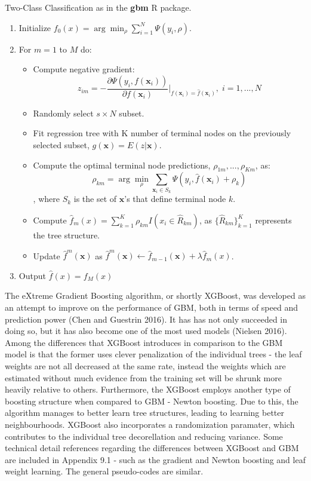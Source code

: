 \documentclass[12pt,]{article}
\providecommand{\tightlist}{%
  \setlength{\itemsep}{0pt}\setlength{\parskip}{0pt}}
\begin{document}
Two-Class Classification as in the \textbf{gbm} R package.

\begin{enumerate}
\def\labelenumi{\arabic{enumi}.}
\item
  Initialize \(f_{0}(x) = \arg\min_{\rho}\sum_{i=1}^{N}\Psi(y_i,\rho)\).
\item
  For \(m=1\) to \(M\) do:

  \begin{itemize}
  \tightlist
  \item
    Compute negative gradient:
    \[z_{im}=-\frac{\partial{\Psi(y_{i},f(\mathbf{x}_i))}}{\partial{f(\mathbf{x}_i)}}\rvert_{f(\mathbf{x}_i)=\widehat{f}(\mathbf{x}_i)},\; i=1,...,N\]
  \item
    Randomly select \(s \times N\) subset.
  \item
    Fit regression tree with K number of terminal nodes on the
    previously selected subset, \(g(\mathbf{x})=E(z|\mathbf{x})\).
  \item
    Compute the optimal terminal node predictions,
    \(\rho_{1m},...,\rho_{Km}\), as:
    \[\rho_{km}=\arg\min_{\rho}\sum_{\mathbf{x}_i \in S_k} \Psi(y_i,\widehat{f}(\mathbf{x}_{i})+\rho_k)\],
    where \(S_k\) is the set of \(\mathbf{x}\)'s that define terminal
    node \(k\).
  \item
    Compute
    \(\widehat{f}_{m}(x)=\sum_{k=1}^{K}\rho_{km}I(x_i\in\widehat{R}_{km})\),
    as \(\{\widehat{R}_{km}\}_{k=1}^{K}\) represents the tree structure.
  \item
    Update \(\widehat{f}^{m}(\mathbf{x})\) as
    \(\widehat{f}^{m}(\mathbf{x}) \leftarrow \widehat{f}_{m-1}(\mathbf{x}) + \lambda\widehat{f}_{m}(x)\).
  \end{itemize}
\item
  Output \(\widehat{f}(x) = f_{M}(x)\)
\end{enumerate}

The eXtreme Gradient Boosting algorithm, or shortly XGBoost, was
developed as an attempt to improve on the performance of GBM, both in
terms of speed and prediction power (Chen and Guestrin 2016). It has has
not only succeeded in doing so, but it has also become one of the most
used models (Nielsen 2016). Among the differences that XGBoost
introduces in comparison to the GBM model is that the former uses clever
penalization of the individual trees - the leaf weights are not all
decreased at the same rate, instead the weights which are estimated
without much evidence from the training set will be shrunk more heavily
relative to others. Furthermore, the XGBoost employs another type of
boosting structure when compared to GBM - Newton boosting. Due to this,
the algorithm manages to better learn tree structures, leading to
learning better neighbourhoods. XGBoost also incorporates a
randomization paramater, which contributes to the individual tree
decorellation and reducing variance. Some technical detail references
regarding the differences between XGBoost and GBM are included in
Appendix 9.1 - such as the gradient and Newton boosting and leaf weight
learning. The general pseudo-codes are similar.
\end{document}
